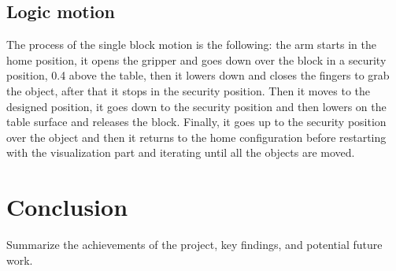 \documentclass[12pt,a4paper]{article}
\begin{document}
\subsection{Logic motion}\label{subsec:logic}
The process of the single block motion is the following: the arm starts in the home position, it opens the gripper and goes down over the block in a security position, 0.4 above the table, then it lowers down and closes the fingers to grab the object, after that it stops in the security position. Then it moves to the designed position, it goes down to the security position and then lowers on the table surface and releases the block. Finally, it goes up to the security position over the object and then it returns to the home configuration before restarting with the visualization part and iterating until all the objects are moved.

\section{Conclusion}\label{sec:conclusion}
Summarize the achievements of the project, key findings, and potential future work. 
\end{document}
